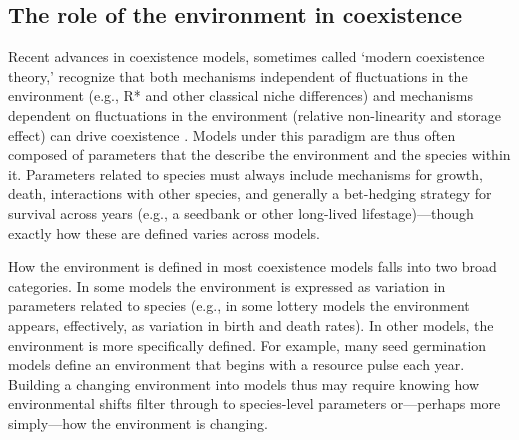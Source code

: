 \documentclass[11pt,letterpaper]{article}
\begin{document}
\subsection{The role of the environment in coexistence} %
Recent advances in coexistence models, sometimes called `modern coexistence theory,' recognize that both mechanisms independent of fluctuations in the environment (e.g., R* and other classical niche differences) and mechanisms dependent on fluctuations in the environment (relative non-linearity and storage effect) can drive coexistence \citep{Chesson:1997dz,Chesson:2000vd}. Models under this paradigm are thus often composed of parameters that the describe the environment and the species within it. Parameters related to species must always include mechanisms for growth, death, interactions with other species, and generally a bet-hedging strategy for survival across years (e.g., a seedbank or other long-lived lifestage)---though exactly how these are defined varies across models.

How the environment is defined in most coexistence models falls into two broad categories. In some models the environment is expressed as variation in parameters related to species (e.g., in some lottery models the environment appears, effectively, as variation in birth and death rates). In other models, the environment is more specifically defined. For example, many seed germination models define an environment that begins with a resource pulse each year. Building a changing environment into models thus may require knowing how environmental shifts filter through to species-level parameters \citep{Tuljapurkar2009} or---perhaps more simply---how the environment is changing. %
\end{document}
